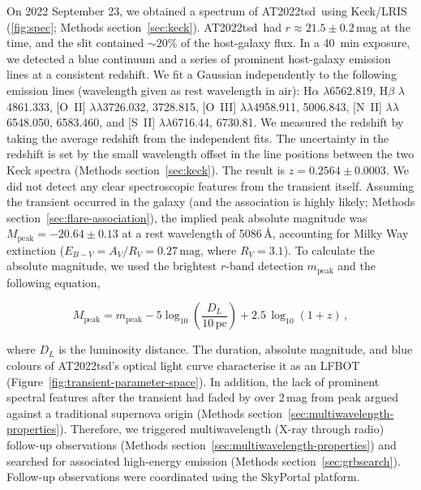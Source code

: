 \documentclass{nature_plusfigure}
\newcommand{\at}{AT2022tsd}
\begin{document}
\begin{methods}
On 2022 September 23, we obtained a spectrum of \at\ using Keck/LRIS (\ref{fig:spec}; Methods section~\ref{sec:keck}).
\at\ had $r\approx21.5\pm0.2$\,mag at the time, and the slit contained $\sim20\%$ of the host-galaxy flux.
In a 40~min exposure, we detected a blue continuum and a series of prominent host-galaxy emission lines at a consistent redshift. We fit a Gaussian independently to the following emission lines (wavelength given as rest wavelength in air): H$\alpha$ $\lambda$6562.819, H$\beta$ $\lambda$4861.333,  [O~II] $\lambda\lambda$3726.032, 3728.815,
 [O~III] $\lambda\lambda$4958.911, 5006.843, 
  [N~II] $\lambda\lambda$6548.050, 6583.460, and [S~II] $\lambda\lambda$6716.44, 6730.81. 
We measured the redshift by taking the average redshift from the independent fits. The uncertainty in the redshift is set by the small wavelength offset in the line positions between the two Keck spectra (Methods section~\ref{sec:keck}). The result is $z=0.2564\pm0.0003$.
We did not detect any clear spectroscopic features from the transient itself.
Assuming the transient occurred in the galaxy (and the association is highly likely; Methods section~\ref{sec:flare-association}), the implied peak absolute magnitude was $M_{\mathrm{peak}}=-20.64\pm0.13$ at a rest wavelength of 5086\,\AA, accounting for Milky Way extinction ($E_{B-V}=A_V/R_V=0.27\,\mathrm{mag}$, where $R_V=3.1$)\cite{Finkbeiner1999,Schlegel1998,Schlafly2011}. 
To calculate the absolute magnitude, we used the brightest $r$-band detection $m_\mathrm{peak}$ and the following equation, %

\begin{equation}
M_\mathrm{peak} = m_\mathrm{peak} - 5 \log_{10} \left( \frac{D_L}{10\,\mathrm{pc}} \right) + 2.5\,\log_{10} (1+z) \, ,
\end{equation}

\noindent where $D_L$ is the luminosity distance. The duration, absolute magnitude, and blue colours of \at's optical light curve characterise it as an LFBOT (Figure~\ref{fig:transient-parameter-space}). In addition, the lack of prominent spectral features after the transient had faded by over 2\,mag from peak argued against a traditional supernova origin (Methods section~\ref{sec:multiwavelength-properties}). Therefore, we triggered multiwavelength (X-ray through radio) follow-up observations (Methods section~\ref{sec:multiwavelength-properties}) and searched for associated high-energy emission (Methods section~\ref{sec:grbsearch}). Follow-up observations were coordinated using the SkyPortal\cite{vanderWalt2019,Coughlin2023} platform.


\end{methods}
\end{document}
